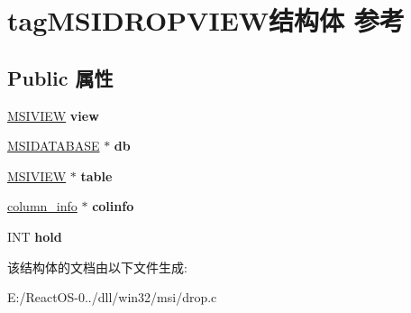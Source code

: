 \hypertarget{structtag_m_s_i_d_r_o_p_v_i_e_w}{}\section{tag\+M\+S\+I\+D\+R\+O\+P\+V\+I\+E\+W结构体 参考}
\label{structtag_m_s_i_d_r_o_p_v_i_e_w}
\subsection*{Public 属性}
\begin{DoxyCompactItemize}
\item 
\mbox{\label{structtag_m_s_i_d_r_o_p_v_i_e_w_ac8da1df9cc385c2d29b02c52c86b967e}} 
\hyperlink{structtag_m_s_i_v_i_e_w}{M\+S\+I\+V\+I\+EW} {\bfseries view}
\item 
\mbox{\label{structtag_m_s_i_d_r_o_p_v_i_e_w_ab6adbea652bf25987206ac2764a210d9}} 
\hyperlink{structtag_m_s_i_d_a_t_a_b_a_s_e}{M\+S\+I\+D\+A\+T\+A\+B\+A\+SE} $\ast$ {\bfseries db}
\item 
\mbox{\label{structtag_m_s_i_d_r_o_p_v_i_e_w_afec295dddf5a53fcfcb5264bcabf4274}} 
\hyperlink{structtag_m_s_i_v_i_e_w}{M\+S\+I\+V\+I\+EW} $\ast$ {\bfseries table}
\item 
\mbox{\label{structtag_m_s_i_d_r_o_p_v_i_e_w_a0596053a458ddef04a7602d701b5ad9a}} 
\hyperlink{struct__column__info}{column\+\_\+info} $\ast$ {\bfseries colinfo}
\item 
\mbox{\label{structtag_m_s_i_d_r_o_p_v_i_e_w_a8afce208a03dbe1e066c6ba80a4a6976}} 
I\+NT {\bfseries hold}
\end{DoxyCompactItemize}


该结构体的文档由以下文件生成\+:\begin{DoxyCompactItemize}
\item 
E\+:/\+React\+O\+S-\/0../dll/win32/msi/drop.\+c\end{DoxyCompactItemize}
